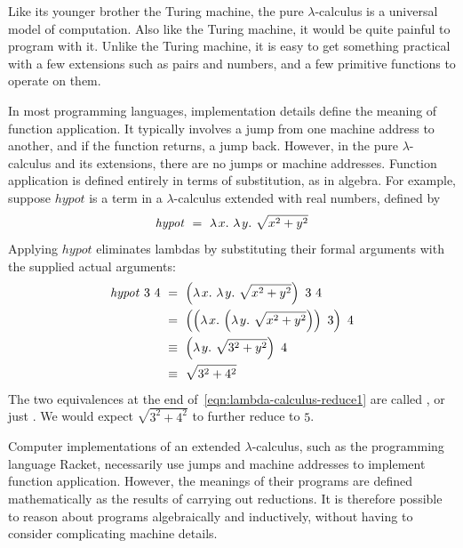 Like its younger brother the Turing machine, the pure $\lambda$-calculus is a universal model of computation.
Also like the Turing machine, it would be quite painful to program with it.
Unlike the Turing machine, it is easy to get something practical with a few extensions such as pairs and numbers, and a few primitive functions to operate on them.

In most programming languages, implementation details define the meaning of function application.
It typically involves a jump from one machine address to another, and if the function returns, a jump back.
However, in the pure $\lambda$-calculus and its extensions, there are no jumps or machine addresses.
Function application is defined entirely in terms of substitution, as in algebra.
For example, suppose  $\mathit{hypot}$ is a term in a $\lambda$-calculus extended with real numbers, defined by
\begin{equation}
	\mathit{hypot}\ =\ \lambda\mspace{2mu}{x}\ldotp\,\lambda\mspace{2mu}{y}\ldotp\, \sqrt{x^2 + y^2}
\end{equation}
Applying $\mathit{hypot}$ eliminates lambdas by substituting their formal arguments with the supplied actual arguments:
\begin{equation}
\begin{aligned}
	\mathit{hypot}~3~4
		&\ =\ \left(\lambda\mspace{2mu}{x}\ldotp\,\lambda\mspace{2mu}{y}\ldotp\, \sqrt{x^2 + y^2}\right)~3~4 \\
		&\ =\ \left(\left(\lambda\mspace{2mu}{x}\ldotp\,\left(\lambda\mspace{2mu}{y}\ldotp\, \sqrt{x^2 + y^2}\right)\right)~3\right)~4 \\
		&\ \equiv\ \left(\lambda\mspace{2mu}{y}\ldotp\, \sqrt{3^2 + y^2}\right)~4 \\
		&\ \equiv\ \sqrt{3^2 + 4^2} \\
\end{aligned}
\label{eqn:lambda-calculus-reduce1}
\end{equation}
The two equivalences at the end of~\eqref{eqn:lambda-calculus-reduce1} are called , or just .
We would expect $\sqrt{3^2 + 4^2}$ to further reduce to $5$.

Computer implementations of an extended $\lambda$-calculus, such as the programming language Racket, necessarily use jumps and machine addresses to implement function application.
However, the meanings of their programs are defined mathematically as the results of carrying out reductions.
It is therefore possible to reason about programs algebraically and inductively, without having to consider complicating machine details.

